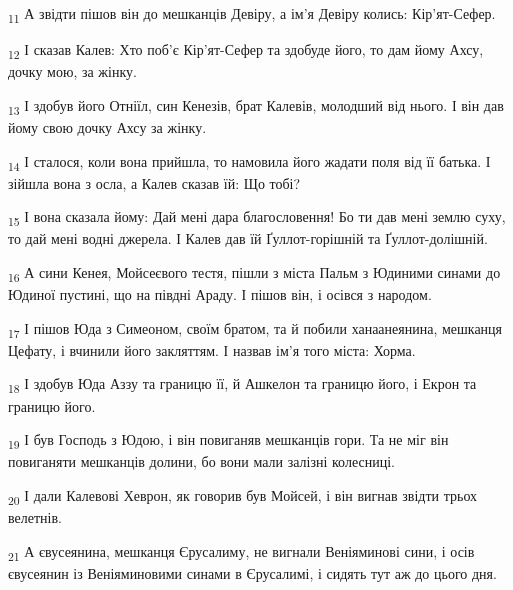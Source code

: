 \begin{tcolorbox}
\textsubscript{11} А звідти пішов він до мешканців Девіру, а ім'я Девіру колись: Кір'ят-Сефер.
\end{tcolorbox}
\begin{tcolorbox}
\textsubscript{12} І сказав Калев: Хто поб'є Кір'ят-Сефер та здобуде його, то дам йому Ахсу, дочку мою, за жінку.
\end{tcolorbox}
\begin{tcolorbox}
\textsubscript{13} І здобув його Отніїл, син Кенезів, брат Калевів, молодший від нього. І він дав йому свою дочку Ахсу за жінку.
\end{tcolorbox}
\begin{tcolorbox}
\textsubscript{14} І сталося, коли вона прийшла, то намовила його жадати поля від її батька. І зійшла вона з осла, а Калев сказав їй: Що тобі?
\end{tcolorbox}
\begin{tcolorbox}
\textsubscript{15} І вона сказала йому: Дай мені дара благословення! Бо ти дав мені землю суху, то дай мені водні джерела. І Калев дав їй Ґуллот-горішній та Ґуллот-долішній.
\end{tcolorbox}
\begin{tcolorbox}
\textsubscript{16} А сини Кенея, Мойсеєвого тестя, пішли з міста Пальм з Юдиними синами до Юдиної пустині, що на півдні Араду. І пішов він, і осівся з народом.
\end{tcolorbox}
\begin{tcolorbox}
\textsubscript{17} І пішов Юда з Симеоном, своїм братом, та й побили ханаанеянина, мешканця Цефату, і вчинили його закляттям. І назвав ім'я того міста: Хорма.
\end{tcolorbox}
\begin{tcolorbox}
\textsubscript{18} І здобув Юда Аззу та границю її, й Ашкелон та границю його, і Екрон та границю його.
\end{tcolorbox}
\begin{tcolorbox}
\textsubscript{19} І був Господь з Юдою, і він повиганяв мешканців гори. Та не міг він повиганяти мешканців долини, бо вони мали залізні колесниці.
\end{tcolorbox}
\begin{tcolorbox}
\textsubscript{20} І дали Калевові Хеврон, як говорив був Мойсей, і він вигнав звідти трьох велетнів.
\end{tcolorbox}
\begin{tcolorbox}
\textsubscript{21} А євусеянина, мешканця Єрусалиму, не вигнали Веніяминові сини, і осів євусеянин із Веніяминовими синами в Єрусалимі, і сидять тут аж до цього дня.
\end{tcolorbox}
